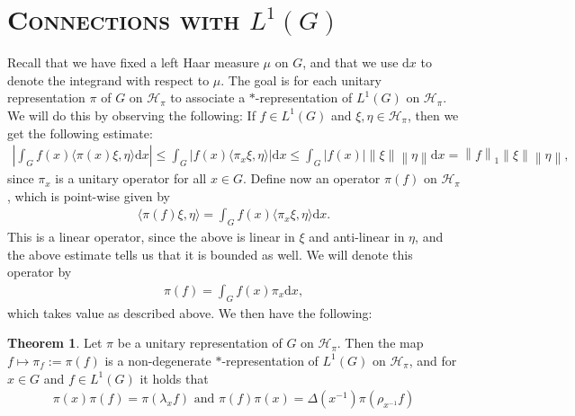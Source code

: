 \documentclass[10pt,twoside,openany,final]{memoir}
\newcommand{\sssection}[1]{%
\section[#1]{\centering\normalfont\scshape \textbf{#1}}}
\theoremstyle{definition}
\newtheorem{theorem}{Theorem}[chapter]
\theoremstyle{Break}
\newcommand{\lv}{\left\lVert}
\newcommand{\rv}{\right\rVert}
\renewcommand{\H}{\mathcal{H}}
\renewcommand{\d}{\mathrm{d}}
\begin{document}
\sssection{Connections with $L^1(G)$}
Recall that we have fixed a left Haar measure $\mu$ on $G$, and that we use $\d x$ to denote the integrand with respect to $\mu$. The goal is for each unitary representation $\pi$ of $G$ on $\H_\pi$ to associate a $*$-representation of $L^1(G)$ on $\H_\pi$. We will do this by observing the following: If $f \in L^1(G)$ and $\xi,\eta \in \H_\pi$, then we get the following estimate:
\begin{align*}
	\left| \int_G  f(x)\langle \pi(x) \xi,\eta \rangle \d x\right| \leq \int_G |f(x) \langle \pi_x \xi, \eta \rangle| \d x \leq \int_G |f(x)| \lv \xi \rv \lv \eta \rv \d x =\lv f \rv_1 \lv \xi \rv \lv \eta \rv,
\end{align*}
since $\pi_x$ is a unitary operator for all $x \in G$. Define now an operator $\pi(f)$ on $\H_\pi$, which is point-wise given by
\begin{align}
	\langle \pi(f) \xi,\eta\rangle= \int_G f(x) \langle \pi_x \xi, \eta \rangle \d x.
	\label{indrep}
\end{align}
This is a linear operator, since the above is linear in $\xi$ and anti-linear in $\eta$, and the above estimate tells us that it is bounded as well. We will denote this operator by
\begin{align*}
	\pi(f)= \int_G f(x) \pi_x \d x,
\end{align*}
which takes value as described above. We then have the following:
\begin{theorem}
	Let $\pi$ be a unitary representation of $G$ on $\H_\pi$. Then the map $f \mapsto \pi_f:=\pi(f)$ is a non-degenerate $*$-representation of $L^1(G)$ on $\H_\pi$, and for $x \in G$ and $f \in L^1(G)$ it holds that
	\begin{align*}
		\pi(x) \pi(f) = \pi(\lambda_x f) \text{ and } \pi(f) \pi(x) = \Delta(x^{-1}) \pi(\rho_{x^{-1}} f)
	\end{align*}
	\label{thm3.9}
\end{theorem}
\end{document}

